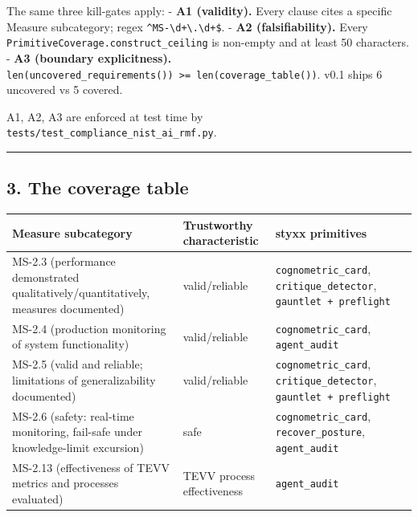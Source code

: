 \documentclass[
]{article}
\newcounter{none} %
\begin{document}
The same three kill-gates apply: - \textbf{A1 (validity).} Every clause
cites a specific Measure subcategory; regex
\texttt{\^{}MS-\textbackslash{}d+\textbackslash{}.\textbackslash{}d+\$}.
- \textbf{A2 (falsifiability).} Every
\texttt{PrimitiveCoverage.construct\_ceiling} is non-empty and at least
50 characters. - \textbf{A3 (boundary explicitness).}
\texttt{len(uncovered\_requirements())\ \textgreater{}=\ len(coverage\_table())}.
v0.1 ships 6 uncovered vs 5 covered.

A1, A2, A3 are enforced at test time by
\texttt{tests/test\_compliance\_nist\_ai\_rmf.py}.

\begin{center}\rule{0.5\linewidth}{0.5pt}\end{center}

\subsection{3. The coverage table}\label{the-coverage-table}

{\def\LTcaptype{none} %
\begin{longtable}[]{@{}
  >{\raggedright\arraybackslash}p{}
  >{\raggedright\arraybackslash}p{}
  >{\raggedright\arraybackslash}p{}@{}}
\toprule\noalign{}
\begin{minipage}[b]{\linewidth}\raggedright
Measure subcategory
\end{minipage} & \begin{minipage}[b]{\linewidth}\raggedright
Trustworthy characteristic
\end{minipage} & \begin{minipage}[b]{\linewidth}\raggedright
styxx primitives
\end{minipage} \\
\midrule\noalign{}
\endhead
\bottomrule\noalign{}
\endlastfoot
MS-2.3 (performance demonstrated qualitatively/quantitatively, measures
documented) & valid/reliable & \texttt{cognometric\_card},
\texttt{critique\_detector}, \texttt{gauntlet\ +\ preflight} \\
MS-2.4 (production monitoring of system functionality) & valid/reliable
& \texttt{cognometric\_card}, \texttt{agent\_audit} \\
MS-2.5 (valid and reliable; limitations of generalizability documented)
& valid/reliable & \texttt{cognometric\_card},
\texttt{critique\_detector}, \texttt{gauntlet\ +\ preflight} \\
MS-2.6 (safety: real-time monitoring, fail-safe under knowledge-limit
excursion) & safe & \texttt{cognometric\_card},
\texttt{recover\_posture}, \texttt{agent\_audit} \\
MS-2.13 (effectiveness of TEVV metrics and processes evaluated) & TEVV
process effectiveness & \texttt{agent\_audit} \\
\end{longtable}
}
\end{document}
